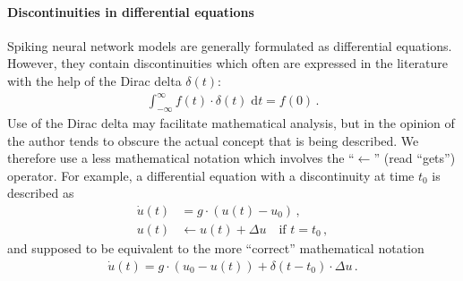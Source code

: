 \paragraph{Discontinuities in differential equations}
Spiking neural network models are generally formulated as differential equations. However, they contain discontinuities which often are expressed in the literature with the help of the Dirac delta $\delta(t)$:
\begin{align}
 	\int_{-\infty}^{\infty} f(t) \cdot \delta(t) \; \mathrm{d}t = f(0) \,.
\end{align}
Use of the Dirac delta may facilitate mathematical analysis, but in the opinion of the author tends to obscure the actual concept that is being described. We therefore use a less mathematical notation which involves the \enquote{$\gets$} (read \enquote{gets}) operator. For example, a differential equation with a discontinuity at time $t_0$ is described as
\begin{align}
	\dot u(t) &= g \cdot (u(t) - u_0) \,,\\
	u(t) &\gets u(t) + \Delta u \quad \text{if } t = t_0\,,
\end{align}
and supposed to be equivalent to the more \enquote{correct} mathematical notation
\begin{align}
	\dot u(t) = g \cdot (u_0 - u(t)) + \delta(t - t_0) \cdot \Delta u\,.
\end{align}
